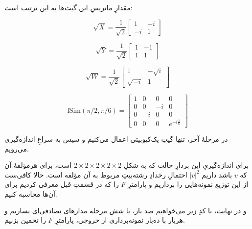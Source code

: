 \documentclass[11pt]{article}
\begin{document}
 مقدارِ ماتریسِ این گیت‌ها به این ترتیب است:
 
\[ \sqrt{X} = \frac{1}{\sqrt{2}} \begin{bmatrix} 1 & - i \\ -i & 1 \end{bmatrix} \]
 
\[ \sqrt{Y} = \frac{1}{\sqrt{2}} \begin{bmatrix} 1 & - 1 \\ 1 & 1 \end{bmatrix} \]

\[ \sqrt{W} = \frac{1}{\sqrt{2}} \begin{bmatrix} 1 & - \sqrt{i} \\ \sqrt{-i} & 1 \end{bmatrix} \]

\[ \text{fSim}(\pi/2, \pi/6) = \begin{bmatrix} 
1 & 0 & 0 & 0 \\
0 & 0 & -i & 0 \\
0 & -i & 0 & 0 \\
0 & 0 & 0 & e^{-i\frac{\pi}{6}} \end{bmatrix} \]

در مرحلهٔ آخر، تنها گیتِ یک‌کیوبیتی اعمال می‌کنیم و سپس به سراغِ اندازه‌گیری می‌رویم.

برای اندازه‌گیریِ این بردارِ حالت که به شکلِ 
$2\times 2\times 2\times 2\times 2$
است، برای هرمؤلفهٔ آن که $v$ باشد داریم 
$|v|^2$
احتمالِ رخدادِ رشته‌بیتِ مربوط به آن مؤلفه است. حالا کافی‌ست از این توزیع نمونه‌هایی را برداریم و پارامترِ $F$ را که در قسمتِ قبل معرفی کردیم برای آن‌ها محاسبه کنیم.

و در نهایت، با کدِ زیر می‌خواهیم صد بار،  با شش مرحله مدارهای تصادفی‌ای بسازیم و هربار با ده‌بار نمونه‌برداری از خروجی، پارامترِ $F$ را تخمین بزنیم.
\end{document}
